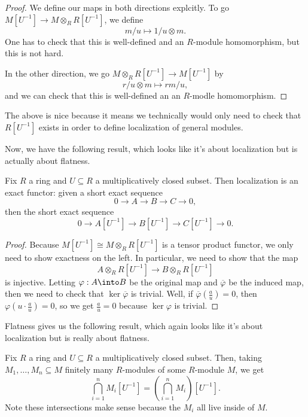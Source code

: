 \begin{proof}
	We define our maps in both directions explcitly. To go $M\left[U^{-1}\right]\to M\otimes_R R\left[U^{-1}\right]$, we define
	\[m/u\mapsto1/u\otimes m.\]
	One has to check that this is well-defined and an $R$-module homomorphism, but this is not hard.

	In the other direction, we go $M\otimes_RR\left[U^{-1}\right]\to M\left[U^{-1}\right]$ by
	\[r/u\otimes m\mapsto rm/u,\]
	and we can check that this is well-defined an an $R$-modle homomorphism.
\end{proof}
The above is nice because it means we technically would only need to check that $R\left[U^{-1}\right]$ exists in order to define localization of general modules.

Now, we have the following result, which looks like it's about localization but is actually about flatness.
\begin{proposition}
	Fix $R$ a ring and $U\subseteq R$ a multiplicatively closed subset. Then localization is an exact functor: given a short exact sequence
	\[0\to A\to B\to C\to 0,\]
	then the short exact sequence
	\[0\to A\left[U^{-1}\right]\to B\left[U^{-1}\right]\to C\left[U^{-1}\right]\to 0.\]
\end{proposition}
\begin{proof}
	Because $M\left[U^{-1}\right]\cong M\otimes_RR\left[U^{-1}\right]$ is a tensor product functor, we only need to show exactness on the left. In particular, we need to show that the map
	\[A\otimes_RR\left[U^{-1}\right]\to B\otimes_RR\left[U^{-1}\right]\]
	is injective. Letting $\varphi:A\into B$ be the original map and $\overline\varphi$ be the induced map, then we need to check that $\ker\overline\varphi$ is trivial.
	Well, if $\overline\varphi\left(\frac au\right)=0$, then $\varphi\left(u\cdot\frac au\right)=0$,
	so we get $\frac au=0$ because $\ker\varphi$ is trivial.
\end{proof}
Flatness gives us the following result, which again looks like it's about localization but is really about flatness.
\begin{corollary}
	Fix $R$ a ring and $U\subseteq R$ a multiplicatively closed subset. Then, taking $M_1,\ldots,M_n\subseteq M$ finitely many $R$-modules of some $R$-module $M$, we get
	\[\bigcap_{i=1}^nM_i\left[U^{-1}\right]=\left(\bigcap_{i=1}^nM_i\right)\left[U^{-1}\right].\]
	Note these intersections make sense because the $M_i$ all live inside of $M$.
\end{corollary}
